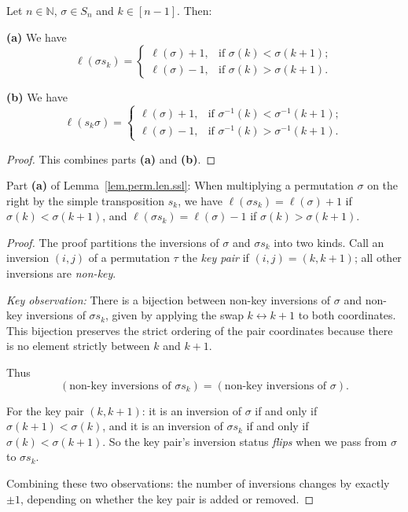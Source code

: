 
\begin{lemma}
\label{lem.perm.len.ssl}
\leantarget
\leanok
Let $n \in \mathbb{N}$, $\sigma \in S_n$ and $k \in [n-1]$. Then:
\medskip

\textbf{(a)} We have
\[
\ell(\sigma s_k) =
\begin{cases}
\ell(\sigma) + 1, & \text{if } \sigma(k) < \sigma(k+1); \\
\ell(\sigma) - 1, & \text{if } \sigma(k) > \sigma(k+1).
\end{cases}
\]

\textbf{(b)} We have
\[
\ell(s_k \sigma) =
\begin{cases}
\ell(\sigma) + 1, & \text{if } \sigma^{-1}(k) < \sigma^{-1}(k+1); \\
\ell(\sigma) - 1, & \text{if } \sigma^{-1}(k) > \sigma^{-1}(k+1).
\end{cases}
\]
\end{lemma}

\begin{proof}
This combines parts \textbf{(a)} and \textbf{(b)}.
\end{proof}

\begin{theorem}
\label{lem.perm.len.ssl.a}
\leanhelper
\leanok
Part \textbf{(a)} of Lemma~\ref{lem.perm.len.ssl}: When multiplying a permutation $\sigma$
on the right by the simple transposition $s_k$, we have
$\ell(\sigma s_k) = \ell(\sigma) + 1$ if $\sigma(k) < \sigma(k+1)$,
and $\ell(\sigma s_k) = \ell(\sigma) - 1$ if $\sigma(k) > \sigma(k+1)$.
\end{theorem}

\begin{proof}
\leanok
The proof partitions the inversions of $\sigma$ and $\sigma s_k$ into two kinds.
Call an inversion $(i,j)$ of a permutation $\tau$ the \emph{key pair}
if $(i,j) = (k,k+1)$; all other inversions are \emph{non-key}.

\emph{Key observation:} There is a bijection between non-key inversions
of $\sigma$ and non-key inversions of $\sigma s_k$, given by applying
the swap $k \leftrightarrow k+1$ to both coordinates.
This bijection preserves the strict ordering of the pair coordinates
because there is no element strictly between $k$ and $k+1$.

Thus
\[
(\text{non-key inversions of } \sigma s_k) = (\text{non-key inversions of } \sigma).
\]

For the key pair $(k,k+1)$: it is an inversion of $\sigma$ if and only if
$\sigma(k+1) < \sigma(k)$, and it is an inversion of $\sigma s_k$ if and only if
$\sigma(k) < \sigma(k+1)$.
So the key pair's inversion status \emph{flips} when we pass from $\sigma$ to $\sigma s_k$.

Combining these two observations: the number of inversions changes by exactly $\pm 1$,
depending on whether the key pair is added or removed.
\end{proof}

